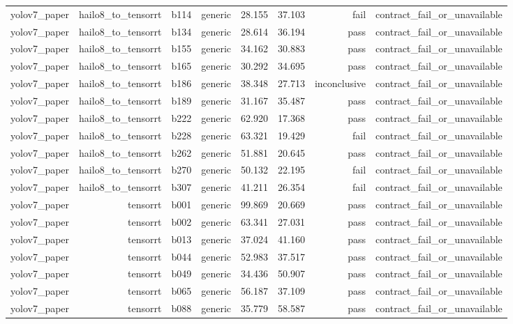 \begin{table}[t]
\begin{tabular}{lrrrrrrr}
yolov7\_paper & hailo8\_to\_tensorrt & b114 & generic & 28.155 & 37.103 & fail & contract\_fail\_or\_unavailable \\
yolov7\_paper & hailo8\_to\_tensorrt & b134 & generic & 28.614 & 36.194 & pass & contract\_fail\_or\_unavailable \\
yolov7\_paper & hailo8\_to\_tensorrt & b155 & generic & 34.162 & 30.883 & pass & contract\_fail\_or\_unavailable \\
yolov7\_paper & hailo8\_to\_tensorrt & b165 & generic & 30.292 & 34.695 & pass & contract\_fail\_or\_unavailable \\
yolov7\_paper & hailo8\_to\_tensorrt & b186 & generic & 38.348 & 27.713 & inconclusive & contract\_fail\_or\_unavailable \\
yolov7\_paper & hailo8\_to\_tensorrt & b189 & generic & 31.167 & 35.487 & pass & contract\_fail\_or\_unavailable \\
yolov7\_paper & hailo8\_to\_tensorrt & b222 & generic & 62.920 & 17.368 & pass & contract\_fail\_or\_unavailable \\
yolov7\_paper & hailo8\_to\_tensorrt & b228 & generic & 63.321 & 19.429 & fail & contract\_fail\_or\_unavailable \\
yolov7\_paper & hailo8\_to\_tensorrt & b262 & generic & 51.881 & 20.645 & pass & contract\_fail\_or\_unavailable \\
yolov7\_paper & hailo8\_to\_tensorrt & b270 & generic & 50.132 & 22.195 & fail & contract\_fail\_or\_unavailable \\
yolov7\_paper & hailo8\_to\_tensorrt & b307 & generic & 41.211 & 26.354 & fail & contract\_fail\_or\_unavailable \\
yolov7\_paper & tensorrt & b001 & generic & 99.869 & 20.669 & pass & contract\_fail\_or\_unavailable \\
yolov7\_paper & tensorrt & b002 & generic & 63.341 & 27.031 & pass & contract\_fail\_or\_unavailable \\
yolov7\_paper & tensorrt & b013 & generic & 37.024 & 41.160 & pass & contract\_fail\_or\_unavailable \\
yolov7\_paper & tensorrt & b044 & generic & 52.983 & 37.517 & pass & contract\_fail\_or\_unavailable \\
yolov7\_paper & tensorrt & b049 & generic & 34.436 & 50.907 & pass & contract\_fail\_or\_unavailable \\
yolov7\_paper & tensorrt & b065 & generic & 56.187 & 37.109 & pass & contract\_fail\_or\_unavailable \\
yolov7\_paper & tensorrt & b088 & generic & 35.779 & 58.587 & pass & contract\_fail\_or\_unavailable \\

\end{tabular}
\end{table}
